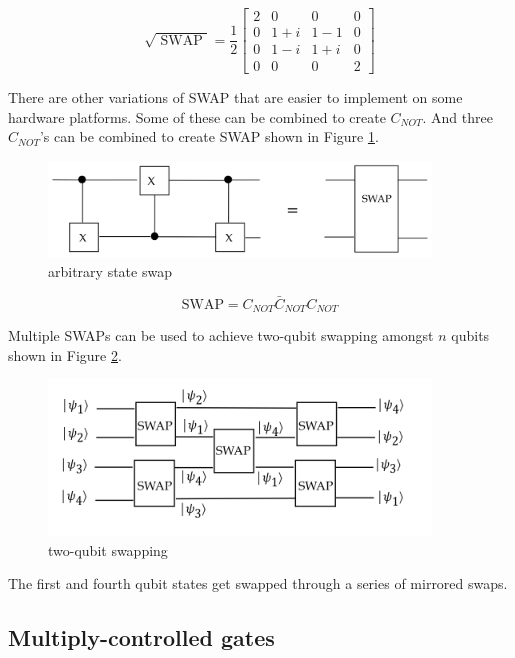 \documentclass[main.tex]{subfiles}
\begin{document}
    $$
    \sqrt{\text { SWAP }}=\frac{1}{2}\left[\begin{array}{cccc}
    2 & 0 & 0 & 0 \\
    0 & 1+i & 1-1 & 0 \\
    0 & 1-i & 1+i & 0 \\
    0 & 0 & 0 & 2
    \end{array}\right]
    $$
    
    There are other variations of SWAP that are easier to implement on some hardware platforms. Some of these can be combined to create $C_{NOT}$. And three $C_{NOT}$'s can be combined to create SWAP shown in Figure \ref{fig:26swap4}.
    
    \begin{figure}
        \centering
        \includegraphics[width=4in]{notes/figs/n08/26swap4.png}
        \caption{arbitrary state swap}
        \label{fig:26swap4}
    \end{figure}
    
    $$
    \text{SWAP}=C_{NOT} \bar{C}_{N O T} C_{N O T}
    $$

    Multiple SWAPs can be used to achieve two-qubit swapping amongst $n$ qubits shown in Figure \ref{fig:27swap5}.
    
    \begin{figure}
        \centering
        \includegraphics[width=4in]{notes/figs/n08/27swap5.png}
        \caption{two-qubit swapping}
        \label{fig:27swap5}
    \end{figure}
    
    The first and fourth qubit states get swapped through a series of mirrored swaps.
    
\subsection{Multiply-controlled gates}
\end{document}
